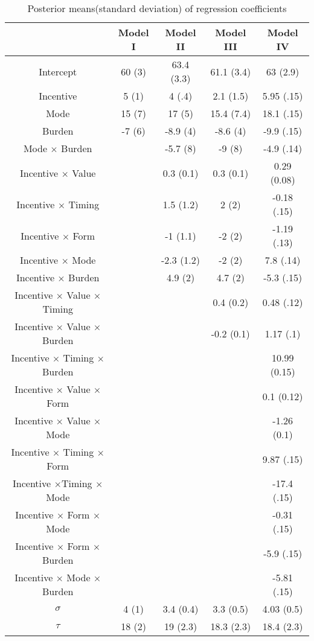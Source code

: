 \documentclass{article}
\begin{document}
\begin{table}[H]
\caption {Posterior means(standard deviation) of regression coefficients}
\vspace{2mm}
\def\arraystretch{1.5}
\centering \begin{tabular}{c c c c c} 
\hline\hline 
\vspace{1mm}
& Model I & Model II & Model III  & Model IV \\ [0.5ex] 
\hline 
Intercept & 60 (3) & 63.4 (3.3) & 61.1 (3.4) & 63 (2.9)\\
Incentive & 5 (1)  & 4 (.4) & 2.1 (1.5)  & 5.95 (.15)\\ 
Mode & 15 (7) & 17 (5) & 15.4 (7.4) & 18.1 (.15) \\
Burden & -7 (6) & -8.9 (4) & -8.6 (4) & -9.9 (.15)\\
Mode $\times$ Burden &  & -5.7 (8)  & -9 (8) & -4.9 (.14) \\
Incentive $\times$ Value &  & 0.3 (0.1) & 0.3 (0.1) & 0.29 (0.08) \\
Incentive $\times$ Timing &  & 1.5 (1.2) & 2 (2) & -0.18 (.15)\\
Incentive $\times$ Form &  & -1 (1.1) & -2 (2) & -1.19 (.13) \\
Incentive $\times$ Mode &  & -2.3 (1.2) & -2 (2) & 7.8 (.14) \\
Incentive $\times$ Burden  & & 4.9 (2)  & 4.7 (2) & -5.3 (.15)\\
Incentive $\times$ Value $\times$ Timing &  &  & 0.4 (0.2) & 0.48 (.12)\\ 
Incentive $\times$ Value $\times$ Burden  &  &  & -0.2 (0.1)  & 1.17 (.1)  \\
Incentive $\times$ Timing $\times$ Burden  &  &  & & 10.99 (0.15) \\
Incentive $\times$ Value $\times$ Form  &  &  & & 0.1 (0.12) \\
Incentive $\times$ Value $\times$ Mode  &  &  & & -1.26 (0.1)\\
Incentive $\times$ Timing $\times$ Form  &  &  & & 9.87 (.15)\\
Incentive $\times$Timing $\times$ Mode  &  &  & & -17.4 (.15) \\
Incentive $\times$ Form $\times$ Mode  &  &  & & -0.31 (.15) \\
Incentive $\times$ Form $\times$ Burden  &  &  & & -5.9 (.15)\\
Incentive $\times$ Mode $\times$ Burden  &  &  & & -5.81 (.15) \\
\hline 
$\sigma$  & 4 (1) & 3.4 (0.4) & 3.3 (0.5) & 4.03 (0.5)\\
$\tau$ & 18 (2) & 19 (2.3) & 18.3 (2.3) & 18.4 (2.3)\\
\end{tabular}
\end{table}
\end{document}
